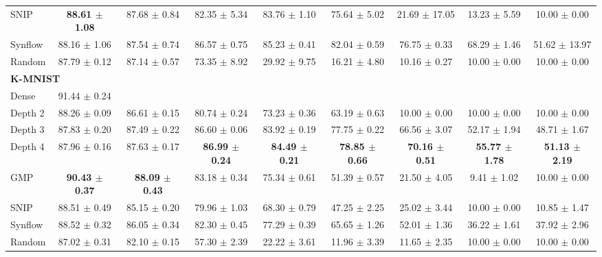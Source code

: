 \begin{table}[b]
{\begin{tabular}{lcccccccc}
SNIP & \textbf{88.61 $\pm$ 1.08} & 87.68 $\pm$ 0.84 & 82.35 $\pm$ 5.34 & 83.76 $\pm$ 1.10 & 75.64 $\pm$ 5.02 & 21.69 $\pm$ 17.05 & 13.23 $\pm$ 5.59 & 10.00 $\pm$ 0.00 \\
Synflow & 88.16 $\pm$ 1.06 & 87.54 $\pm$ 0.74 & 86.57 $\pm$ 0.75 & 85.23 $\pm$ 0.41 & 82.04 $\pm$ 0.59 & 76.75 $\pm$ 0.33 & 68.29 $\pm$ 1.46 & 51.62 $\pm$ 13.97 \\
Random & 87.79 $\pm$ 0.12 & 87.14 $\pm$ 0.57 & 73.35 $\pm$ 8.92 & 29.92 $\pm$ 9.75 & 16.21 $\pm$ 4.80 & 10.16 $\pm$ 0.27 & 10.00 $\pm$ 0.00 & 10.00 $\pm$ 0.00 \\
\hline
\multicolumn{9}{l}{\textbf{K-MNIST}} \\
Dense & 91.44 $\pm$ 0.24 \\
Depth 2 & 88.26 $\pm$ 0.09 & 86.61 $\pm$ 0.15 & 80.74 $\pm$ 0.24 & 73.23 $\pm$ 0.36 & 63.19 $\pm$ 0.63 & 10.00 $\pm$ 0.00 & 10.00 $\pm$ 0.00 & 10.00 $\pm$ 0.00 \\
Depth 3 & 87.83 $\pm$ 0.20 & 87.49 $\pm$ 0.22 & 86.60 $\pm$ 0.06 & 83.92 $\pm$ 0.19 & 77.75 $\pm$ 0.22 & 66.56 $\pm$ 3.07 & 52.17 $\pm$ 1.94 & 48.71 $\pm$ 1.67 \\
Depth 4 & 87.96 $\pm$ 0.16 & 87.63 $\pm$ 0.17 & \textbf{86.99 $\pm$ 0.24} & \textbf{84.49 $\pm$ 0.21} & \textbf{78.85 $\pm$ 0.66} & \textbf{70.16 $\pm$ 0.51} & \textbf{55.77 $\pm$ 1.78} & \textbf{51.13 $\pm$ 2.19} \\
GMP & \textbf{90.43 $\pm$ 0.37} & \textbf{88.09 $\pm$ 0.43} & 83.18 $\pm$ 0.34 & 75.34 $\pm$ 0.61 & 51.39 $\pm$ 0.57 & 21.50 $\pm$ 4.05 & 9.41 $\pm$ 1.02 & 10.00 $\pm$ 0.00 \\
SNIP & 88.51 $\pm$ 0.49 & 85.15 $\pm$ 0.20 & 79.96 $\pm$ 1.03 & 68.30 $\pm$ 0.79 & 47.25 $\pm$ 2.25 & 25.02 $\pm$ 3.44 & 10.00 $\pm$ 0.00 & 10.85 $\pm$ 1.47 \\
Synflow & 88.52 $\pm$ 0.32 & 86.05 $\pm$ 0.34 & 82.30 $\pm$ 0.45 & 77.29 $\pm$ 0.39 & 65.65 $\pm$ 1.26 & 52.01 $\pm$ 1.36 & 36.22 $\pm$ 1.61 & 37.92 $\pm$ 2.96 \\
Random & 87.02 $\pm$ 0.31 & 82.10 $\pm$ 0.15 & 57.30 $\pm$ 2.39 & 22.22 $\pm$ 3.61 & 11.96 $\pm$ 3.39 & 11.65 $\pm$ 2.35 & 10.00 $\pm$ 0.00 & 10.00 $\pm$ 0.00 \\
\hline
\end{tabular}
}

\end{table}